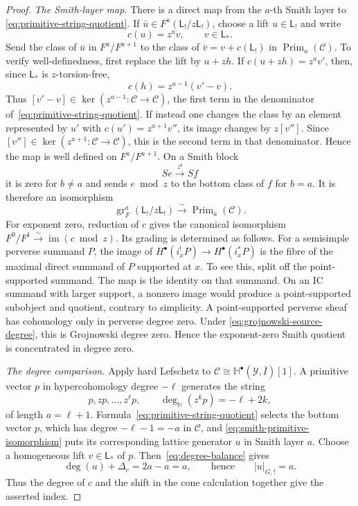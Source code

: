 \documentclass[10pt,a4paper]{amsart}
\begin{document}
\begin{proof}
\smallskip
\noindent\emph{The Smith-layer map.}
There is a direct map from the $a$-th Smith layer to
\eqref{eq:primitive-string-quotient}.  If
$\bar u\in F^a(\mathsf L_!/z\mathsf L_!)$, choose a lift
$u\in\mathsf L_!$ and write
\[
 c(u)=z^a v,\qquad v\in\mathsf L_*.
\]
Send the class of $\bar u$ in $F^a/F^{a+1}$ to the class of
$\bar v=v+c(\mathsf L_!)$ in $\operatorname{Prim}_a(\mathcal C)$.  To verify
well-definedness, first replace the lift by $u+zh$.  If
$c(u+zh)=z^av'$, then, since $\mathsf L_*$ is $z$-torsion-free,
\[
 c(h)=z^{a-1}(v'-v).
\]
Thus $[v'-v]\in\ker(z^{a-1}:\mathcal C\to\mathcal C)$, the first term in
the denominator of~\eqref{eq:primitive-string-quotient}.  If instead one
changes the class by an element represented by $u'$ with
$c(u')=z^{a+1}v''$, its image changes by $z[v'']$.  Since
$[v'']\in\ker(z^{a+1}:\mathcal C\to\mathcal C)$, this is the second term in
that denominator.  Hence the map is well defined on $F^a/F^{a+1}$.  On a
Smith block
\[
 S e\xrightarrow{\ z^b\ }S f
\]
it is zero for $b\ne a$ and sends $e\bmod z$ to the bottom class of $f$ for
$b=a$.  It is therefore an isomorphism
\begin{equation}\label{eq:smith-primitive-isomorphism}
 \operatorname{gr}_F^a(\mathsf L_!/z\mathsf L_!)
 \xrightarrow{\sim}\operatorname{Prim}_a(\mathcal C).
\end{equation}
For exponent zero, reduction of $c$ gives the canonical isomorphism
$F^0/F^1\xrightarrow{\sim}\operatorname{im}(c\bmod z)$.  Its grading is
determined as follows.  For a semisimple perverse summand $P$, the image of
$H^\bullet(i_x^!P)\to H^\bullet(i_x^*P)$ is the fibre of the maximal direct
summand of $P$ supported at $x$.  To see this, split off the point-supported
summand.  The map is the identity on that summand.  On an IC summand with
larger support, a nonzero image would produce a point-supported subobject and
quotient, contrary to simplicity.  A point-supported perverse sheaf has
cohomology only in perverse degree zero.  Under
\eqref{eq:grojnowski-source-degree}, this is Grojnowski degree zero.  Hence
the exponent-zero Smith quotient is concentrated in degree zero.

\smallskip
\noindent\emph{The degree comparison.}
Apply hard Lefschetz to
$\mathcal C\cong\mathbb H^\bullet(\mathcal Y,\overline I)[1]$.  A primitive
vector $p$ in hypercohomology degree $-\ell$ generates the string
\[
 p,zp,\ldots,z^\ell p,
 \qquad \deg_{\mathbb H}(z^kp)=-\ell+2k,
\]
of length $a=\ell+1$.  Formula~\eqref{eq:primitive-string-quotient} selects
the bottom vector $p$, which has degree $-\ell-1=-a$ in $\mathcal C$, and
\eqref{eq:smith-primitive-isomorphism} puts its corresponding lattice
generator $u$ in Smith layer $a$.  Choose a homogeneous lift
$v\in\mathsf L_*$ of $p$.  Then~\eqref{eq:degree-balance} gives
\[
 \deg(u)+\Delta_c=2a-a=a,
 \qquad\text{hence}\qquad |u|_{G,!}=a.
\]
Thus the degree of $c$ and the shift in the cone calculation together give
the asserted index.


\end{proof}
\end{document}
